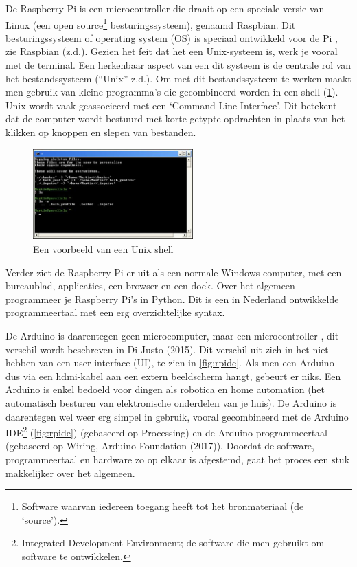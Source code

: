 De Raspberry Pi is een microcontroller die draait op een speciale versie
van Linux (een open source\footnote{Software waarvan iedereen toegang
  heeft tot het bronmateriaal (de `source').} besturingssysteem),
genaamd Raspbian. Dit besturingssysteem of operating system (OS) is
speciaal ontwikkeld voor de Pi , zie Raspbian (z.d.). Gezien het feit
dat het een Unix-systeem is, werk je vooral met de terminal. Een
herkenbaar aspect van een dit systeem is de centrale rol van het
bestandssysteem (``Unix'' z.d.). Om met dit bestandssysteem te werken
maakt men gebruik van kleine programma's die gecombineerd worden in een
shell (\cref{fig:shell}). Unix wordt vaak geassocieerd
met een `Command Line Interface'. Dit betekent dat de computer wordt
bestuurd met korte getypte opdrachten in plaats van het klikken op
knoppen en slepen van bestanden.

\begin{figure}
\centering
\includegraphics[width=0.55\textwidth,height=\textheight]{img/image_12.jpg}
\caption{Een voorbeeld van een Unix shell\label{fig:shell}}
\end{figure}

Verder ziet de Raspberry Pi er uit als een normale Windows computer, met
een bureaublad, applicaties, een browser en een dock. Over het algemeen
programmeer je Raspberry Pi's in Python. Dit is een in Nederland
ontwikkelde programmeertaal met een erg overzichtelijke syntax.

De Arduino is daarentegen geen microcomputer, maar een microcontroller ,
dit verschil wordt beschreven in Di Justo (2015). Dit verschil uit zich
in het niet hebben van een user interface (UI), te zien in
\cref{fig:rpide}. Als men een Arduino dus via een
hdmi-kabel aan een extern beeldscherm hangt, gebeurt er niks. Een
Arduino is enkel bedoeld voor dingen als robotica en home automation
(het automatisch besturen van elektronische onderdelen van je huis). De
Arduino is daarentegen wel weer erg simpel in gebruik, vooral
gecombineerd met de Arduino IDE\footnote{Integrated Development
  Environment; de software die men gebruikt om software te ontwikkelen.}
(\cref{fig:rpide}) (gebaseerd op Processing) en de
Arduino programmeertaal (gebaseerd op Wiring, Arduino Foundation
(2017)). Doordat de software, programmeertaal en hardware zo op elkaar
is afgestemd, gaat het proces een stuk makkelijker over het algemeen.

